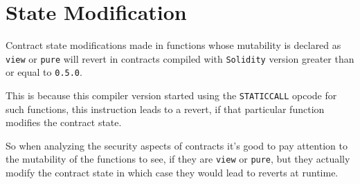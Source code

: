 \section{State Modification}\label{state-modification}

Contract state modifications made in functions whose mutability is
declared as \texttt{view} or \texttt{pure} will revert in contracts
compiled with \texttt{Solidity} version greater than or equal to
\texttt{0.5.0}.

This is because this compiler version started using the
\texttt{STATICCALL} opcode for such functions, this instruction leads to
a revert, if that particular function modifies the contract state.

So when analyzing the security aspects of contracts it's good to pay
attention to the mutability of the functions to see, if they are
\texttt{view} or \texttt{pure}, but they actually modify the contract
state in which case they would lead to reverts at runtime.
